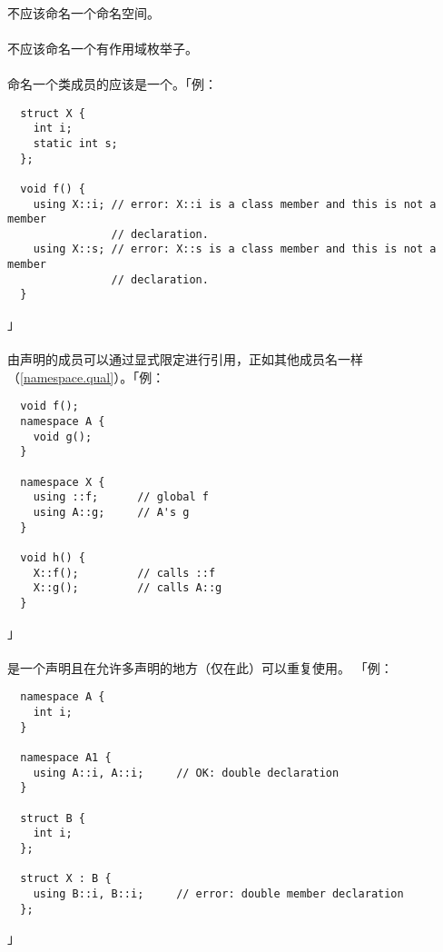\paragraph{}
不应该命名一个命名空间。

\paragraph{}
不应该命名一个有作用域枚举子。

\paragraph{}
命名一个类成员的应该是一个。「例：
\begin{lstlisting}
  struct X {
    int i;
    static int s;
  };

  void f() {
    using X::i; // error: X::i is a class member and this is not a member
                // declaration.
    using X::s; // error: X::s is a class member and this is not a member
                // declaration.
  }
\end{lstlisting}」

\paragraph{}
由声明的成员可以通过显式限定进行引用，正如其他成员名一样
（\ref{namespace.qual}）。「例：
\begin{lstlisting}
  void f();
  namespace A {
    void g();
  }

  namespace X {
    using ::f;      // global f
    using A::g;     // A's g
  }

  void h() {
    X::f();         // calls ::f
    X::g();         // calls A::g
  }
\end{lstlisting}」

\paragraph{}
是一个声明且在允许多声明的地方（仅在此）可以重复使用。
「例：
\begin{lstlisting}
  namespace A {
    int i;
  }

  namespace A1 {
    using A::i, A::i;     // OK: double declaration
  }

  struct B {
    int i;
  }; 

  struct X : B {
    using B::i, B::i;     // error: double member declaration
  };
\end{lstlisting}」

